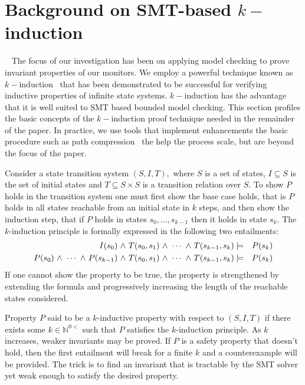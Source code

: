 \section{Background on SMT-based $k-$induction}~\label{sec:background} 
The focus of our  investigation has  been on applying model checking to  prove
invariant properties of our monitors.   We  
employ a powerful technique known as $k-$induction~\cite{Sheeran00,
  EenS03} that has been demonstrated to be successful for verifying inductive
properties of infinite state systems.   $k-$induction  has the
advantage that it is well suited  to  SMT 
based bounded model checking. This section profiles the
basic concepts of the  $k-$induction proof technique needed in the
remainder of the paper. In practice, we
use tools that implement  enhancements the basic procedure such as path
compression~\cite{dMRS03} the help the process scale, but are beyond
the focus of the paper. 

Consider  a state transition system  $(S,I,T),$
where $S$ is a set of states, $I \subseteq S$ is the set of initial
states and $T \subseteq S \times S $ is a transition relation over
$S.$ To show $P$ holds in the transition system one must first
show the base case holds, that is $P$ holds in all states reachable
from an initial state in $k$ steps, and then show the induction step,
that if $P$ holds in states $s_0,\ldots,s_{k-1}$ then it holds in
state $s_k.$ The $k$-induction principle is formally expressed in the
following two entailments:
\begin{eqnarray*}
I(s_0) {\ \wedge \ } T(s_0,s_1) {\ \wedge \ } \cdots {\ \wedge \ } T(s_{k-1},s_k) &\models&
P(s_k) \\
P(s_0) {\ \wedge \ } \cdots {\ \wedge \ } P(s_{k-1}) {\ \wedge \ } T(s_0,s_1) {\ \wedge \ } \cdots {\ \wedge \ } T(s_{k-1},s_k) &\models&
P(s_k) 
\end{eqnarray*} 
If one cannot show the property to be true, the
property is strengthened by extending the formula and
progressively increasing the length of the reachable states
considered.  

Property $P$ said to be a $k$-inductive property with respect to
$(S,I,T)$ if there exists some $k \in \mathbb{N}^{0<}$ such that $P$
satisfies the $k$-induction principle. As $k$ increases, weaker
invariants may be proved. If $P$ is a safety property that doesn't hold, then the first entailment will break for a finite $k$ and a counterexample will be provided. The trick is to find an invariant that is
tractable by the SMT solver yet weak enough to satisfy the desired
property.  
